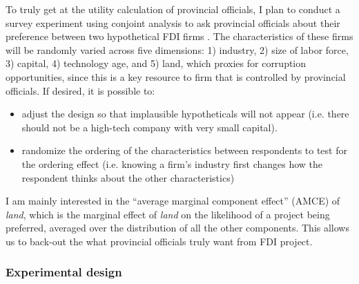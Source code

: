 To truly get at the utility calculation of provincial officials, I plan to conduct a survey experiment using conjoint analysis to ask provincial officials about their preference between two hypothetical FDI firms \citep{Hainmueller2014}. The characteristics of these firms will be randomly varied across five dimensions: 1) industry, 2) size of labor force, 3) capital, 4) technology age, and 5) land, which proxies for corruption opportunities, since this is a key resource to firm that is controlled by provincial officials. If desired, it is possible to:
\begin{itemize}
\item adjust the design so that implausible hypotheticals will not appear (i.e. there should not be a high-tech company with very small capital).
\item randomize the ordering of the characteristics between respondents to test for the ordering effect (i.e. knowing a firm's industry first changes how the respondent thinks about the other characteristics)
\end{itemize}

I am mainly interested in the ``average marginal component effect'' (AMCE) of \textit{land}, which is the marginal effect of \textit{land} on the likelihood of a project being preferred, averaged over the distribution of all the other components. This allows us to back-out the what provincial officials truly want from FDI project.

\subsubsection{Experimental design}

